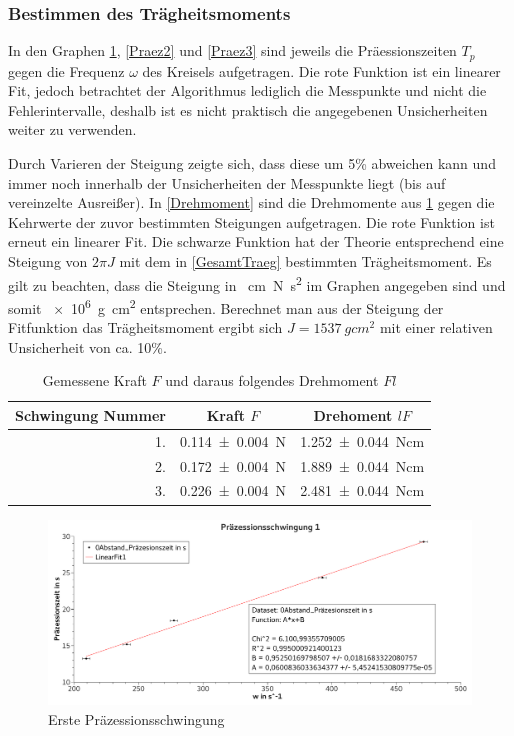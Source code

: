 \documentclass[
	a4paper,
	12pt,
	pagesize,
	ngerman
]{scrartcl}
\begin{document}
	\subsubsection*{Bestimmen des Trägheitsmoments}
	In den Graphen \cref{Praez1}, \cref{Praez2} und \cref{Praez3} sind jeweils die Präessionszeiten $T_p$ gegen die Frequenz $\omega$ des Kreisels aufgetragen. Die rote Funktion ist ein linearer Fit, jedoch betrachtet der Algorithmus lediglich die Messpunkte und nicht die Fehlerintervalle, deshalb ist es nicht praktisch die angegebenen Unsicherheiten weiter zu verwenden. 

	Durch Varieren der Steigung zeigte sich, dass diese um 5\% abweichen kann und immer noch innerhalb der Unsicherheiten der Messpunkte liegt (bis auf vereinzelte Ausreißer).
	In \cref{Drehmoment} sind die Drehmomente aus \cref{Tabelle_Kraft} gegen die Kehrwerte der zuvor bestimmten Steigungen aufgetragen. 
	Die rote Funktion ist erneut ein linearer Fit. 
	Die schwarze Funktion hat der Theorie entsprechend eine Steigung von $2\pi J$ mit dem in \cref{GesamtTraeg} bestimmten Trägheitsmoment.
	Es gilt zu beachten, dass die Steigung in \SI{}{cm N s^2} im Graphen angegeben sind und somit \SI{e6}{g cm^2} entsprechen. 
	Berechnet man aus der Steigung der Fitfunktion das Trägheitsmoment ergibt sich $J = \SI{1537}{g cm^2}$ mit einer relativen Unsicherheit von ca. 10\%.

	\begin{table}[tb]
		\centering
		\begin{tabular}{ r | c | c}
			Schwingung Nummer& Kraft $F$ & Drehoment $lF$\\ \hline
			1.& \SI{0,114 \pm 0,004 }{N}& \SI{1,252 \pm 0,044}{Ncm} \\
			2.& \SI{0,172 \pm 0,004 }{N}& \SI{1,889 \pm 0,044}{Ncm} \\
			3.& \SI{0,226 \pm 0,004 }{N}& \SI{2,481 \pm 0,044}{Ncm} \\
		\end{tabular}
		\caption{Gemessene Kraft $F$ und daraus folgendes Drehmoment $Fl$}
		\label{Tabelle_Kraft} 
	\end{table}

	\begin{figure}[tb]
		\includegraphics[width=1\textwidth]{Praez1}
		\centering
		\caption{Erste Präzessionsschwingung} %
		\label{Praez1}
		\centering
	\end{figure}
\end{document}
